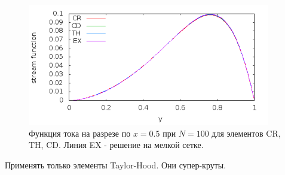 \documentclass[12pt]{article}
\begin{document}
\begin{figure}
	\begin{center}
		\includegraphics[width=400px]{pics/psi_100}
		\caption{Функция тока на разрезе по $x=0.5$ при $N=100$ для элементов CR, TH, CD. Линия EX - решение на мелкой сетке.}
		\label{fg:psi_100}
	\end{center}
\end{figure}

\newpage

Применять только элементы Taylor-Hood. Они супер-круты.
\end{document}
